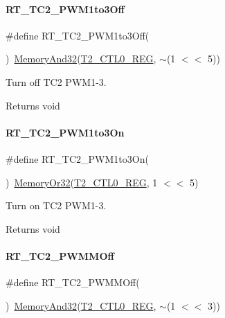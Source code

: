 \paragraph{\texorpdfstring{R\+T\+\_\+\+T\+C2\+\_\+\+P\+W\+M1to3\+Off}{RT\_TC2\_PWM1to3Off}}
{\footnotesize\ttfamily \#define R\+T\+\_\+\+T\+C2\+\_\+\+P\+W\+M1to3\+Off(\begin{DoxyParamCaption}{ }\end{DoxyParamCaption})~\mbox{\hyperlink{a00020_ad87cedffcaadc51db22594fce55173d4}{Memory\+And32}}(\mbox{\hyperlink{a00020_a5853553391e986211306d4f29ab31e47}{T2\+\_\+\+C\+T\+L0\+\_\+\+R\+EG}}, $\sim$(1 $<$$<$ 5))}



Turn off T\+C2 P\+W\+M1-\/3. 

\begin{DoxyReturn}{Returns}
void 
\end{DoxyReturn}
\mbox{\label{a00047_adc090dee2463a2a27b57234e63f0c0b5}} 
\paragraph{\texorpdfstring{R\+T\+\_\+\+T\+C2\+\_\+\+P\+W\+M1to3\+On}{RT\_TC2\_PWM1to3On}}
{\footnotesize\ttfamily \#define R\+T\+\_\+\+T\+C2\+\_\+\+P\+W\+M1to3\+On(\begin{DoxyParamCaption}{ }\end{DoxyParamCaption})~\mbox{\hyperlink{a00020_a27874a97deab7cecdde5ddecf466e31e}{Memory\+Or32}}(\mbox{\hyperlink{a00020_a5853553391e986211306d4f29ab31e47}{T2\+\_\+\+C\+T\+L0\+\_\+\+R\+EG}}, 1 $<$$<$ 5)}



Turn on T\+C2 P\+W\+M1-\/3. 

\begin{DoxyReturn}{Returns}
void 
\end{DoxyReturn}
\mbox{\label{a00047_abe6d0acfd60eb7058f0622de867c5b87}} 
\paragraph{\texorpdfstring{R\+T\+\_\+\+T\+C2\+\_\+\+P\+W\+M\+M\+Off}{RT\_TC2\_PWMMOff}}
{\footnotesize\ttfamily \#define R\+T\+\_\+\+T\+C2\+\_\+\+P\+W\+M\+M\+Off(\begin{DoxyParamCaption}{ }\end{DoxyParamCaption})~\mbox{\hyperlink{a00020_ad87cedffcaadc51db22594fce55173d4}{Memory\+And32}}(\mbox{\hyperlink{a00020_a5853553391e986211306d4f29ab31e47}{T2\+\_\+\+C\+T\+L0\+\_\+\+R\+EG}}, $\sim$(1 $<$$<$ 3))}



